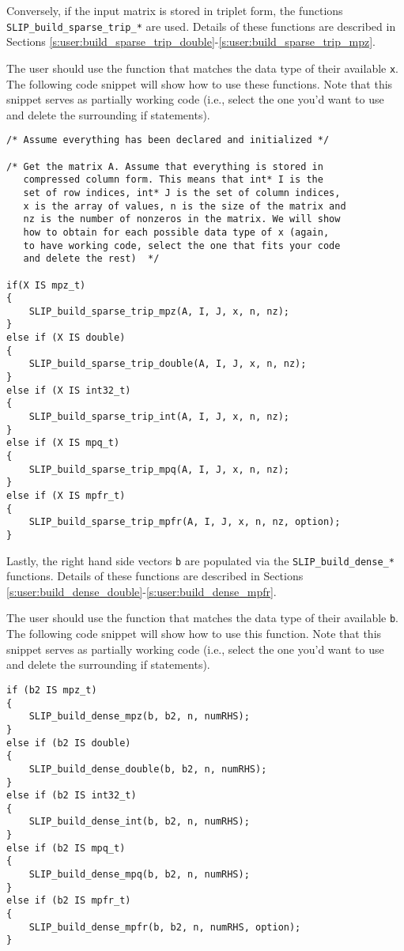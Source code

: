 \documentclass[11pt]{article}
\theoremstyle{definition}
\begin{document}
Conversely, if the input matrix is stored in triplet form, the functions \verb|SLIP_build_sparse_trip_*| are used. Details of these functions are described in Sections \ref{s:user:build_sparse_trip_double}-\ref{s:user:build_sparse_trip_mpz}.

The user should use the function that matches the data type of their available \verb|x|. The following code snippet will show how to use these functions. Note that this snippet serves as partially working code (i.e., select the one you'd want to use and delete the surrounding if statements).

\begin{verbatim}
/* Assume everything has been declared and initialized */

/* Get the matrix A. Assume that everything is stored in
   compressed column form. This means that int* I is the
   set of row indices, int* J is the set of column indices,
   x is the array of values, n is the size of the matrix and
   nz is the number of nonzeros in the matrix. We will show
   how to obtain for each possible data type of x (again,
   to have working code, select the one that fits your code
   and delete the rest)  */

if(X IS mpz_t)
{
    SLIP_build_sparse_trip_mpz(A, I, J, x, n, nz);
}
else if (X IS double)
{
    SLIP_build_sparse_trip_double(A, I, J, x, n, nz);
}
else if (X IS int32_t)
{
    SLIP_build_sparse_trip_int(A, I, J, x, n, nz);
}
else if (X IS mpq_t)
{
    SLIP_build_sparse_trip_mpq(A, I, J, x, n, nz);
}
else if (X IS mpfr_t)
{
    SLIP_build_sparse_trip_mpfr(A, I, J, x, n, nz, option);
}

\end{verbatim}

Lastly, the right hand side vectors \verb|b| are populated via the \verb|SLIP_build_dense_*| functions. Details of these functions are described in Sections \ref{s:user:build_dense_double}-\ref{s:user:build_dense_mpfr}.

The user should use the function that matches the data type of their available \verb|b|. The following code snippet will show how to use this function. Note that this snippet serves as partially working code (i.e., select the one you'd want to use and delete the surrounding if statements).

\begin{verbatim}
if (b2 IS mpz_t)
{
    SLIP_build_dense_mpz(b, b2, n, numRHS);
}
else if (b2 IS double)
{
    SLIP_build_dense_double(b, b2, n, numRHS);
}
else if (b2 IS int32_t)
{
    SLIP_build_dense_int(b, b2, n, numRHS);
}
else if (b2 IS mpq_t)
{
    SLIP_build_dense_mpq(b, b2, n, numRHS);
}
else if (b2 IS mpfr_t)
{
    SLIP_build_dense_mpfr(b, b2, n, numRHS, option);
}


\end{verbatim}
\end{document}
